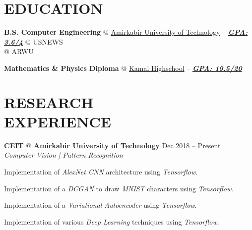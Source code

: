 \documentclass[margin, 10pt]{res} %
\begin{document}
    \begin{resume}
    
     
    \section{EDUCATION}  
    \textbf{B.S. Computer Engineering} \textsc{@}
	   \href{http://aut.ac.ir/aut/}{Amirkabir University of Technology} -- \textit{\textbf{\underline{GPA: 3.6/4}}}
	   { @ USNEWS}\\
	   { @ ARWU }

 
    \textbf{Mathematics \& Physics Diploma} \textsc{@}
    \href{http://www.kamal.sch.ir/}{Kamal Highschool} --
    \textit{\textbf{\underline{GPA: 19.5/20}}}
  
  	\vspace{0.5cm}
    
    \section{RESEARCH \\ EXPERIENCE} 

	\textbf{CEIT} \textsc{@} \textbf{Amirkabir University of Technology}
	\hfill {Dec 2018 -- Present}\\
	\textit{Computer Vision | Pattern Recognition}
	\vspace{0.15cm}
	\begin{innerlist}
		\item Implementation of \textit{AlexNet CNN} architecture using \textit{Tensorflow}.
		
		\item Implementation of a \textit{DCGAN} to draw \textit{MNIST} characters using \textit{Tensorflow}.
		
		\item Implementation of a \textit{Variational Autoencoder} 	using \textit{Tensorflow}.
		
		\item Implementation of various \textit{Deep Learning} techniques using \textit{Tensorflow}.
		

\end{innerlist}
\end{resume}
\end{document}

